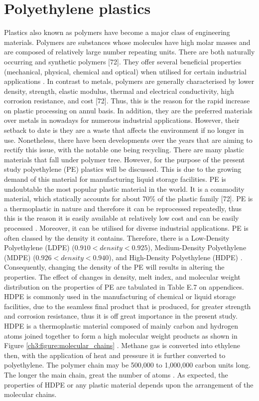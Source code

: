 \documentclass[12pt]{report}
\begin{document}
\section{Polyethylene plastics}
Plastics also known as polymers have become a major class of engineering materials. Polymers are substances whose molecules have high molar masses and are composed of relatively large number repeating units. There are both naturally occurring and synthetic polymers [72]. They offer several beneficial properties (mechanical, physical, chemical and optical) when utilised for certain industrial applications \cite{nugent2017rotational}. In contrast to metals, polymers are generally characterised by lower density, strength, elastic modulus, thermal and electrical conductivity, high corrosion resistance, and cost [72]. Thus, this is the reason for the rapid increase on plastic processing on annul basis. In addition, they are the preferred materials over metals in nowadays for numerous industrial applications. However, their setback to date is they are a waste that affects the environment if no longer in use. Nonetheless, there have been developments over the years that are aiming to rectify this issue, with the notable one being recycling.  
There are many plastic materials that fall under polymer tree. However, for the purpose of the present study polyethylene (PE) plastics will be discussed. This is due to the growing demand of this material for manufacturing liquid storage facilities. PE is undoubtable the most popular plastic material in the world. It is a commodity material, which statically accounts for about 70\% of the plastic family [72].  PE is a thermoplastic in nature and therefore it can be reprocessed repeatedly, thus this is the reason it is easily available at relatively low cost and can be easily processed \cite{kurtz2009cross}. Moreover, it can be utilised for diverse industrial applications. 
PE is often classed by the density it contains. Therefore, there is a Low-Density Polyethylene (LDPE) ($0.910 < density < 0.925$), Medium-Density Polyethylene (MDPE) ($0.926 < density < 0.940$), and High-Density Polyethylene (HDPE) \cite{gabriel1998history}. Consequently, changing the density of the PE will results in altering the properties. The effect of changes in density, melt index, and molecular weight distribution on the properties of PE are tabulated in Table E.7 on appendices. 
HDPE is commonly used in the manufacturing of chemical or liquid storage facilities, due to the seamless final product that is produced, for greater strength and corrosion resistance, thus it is off great importance in the present study. HDPE is a thermoplastic material composed of mainly carbon and hydrogen atoms joined together to form a high molecular weight products as shown in Figure \ref{ch3:figure:molecular_chains} \cite{gabriel1998history}. Methane gas is converted into ethylene then, with the application of heat and pressure it is further converted to polyethylene. The polymer chain may be 500,000 to 1,000,000 carbon units long. The longer the main chain, great the number of atoms \cite{gabriel1998history}. As expected, the properties of HDPE or any plastic material depends upon the arrangement of the molecular chains. 
               
\end{document}
